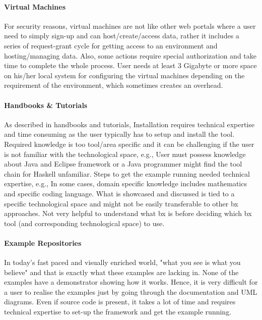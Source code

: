 \paragraph{Virtual Machines}
For security reasons, virtual machines are not like other web portals where a user need to simply sign-up and can host/create/access data, rather it includes a series of request-grant cycle for getting access to an environment and hosting/managing data. Also, some actions require special authorization and take time to complete the whole process.
\newline\newline User needs at least 3 Gigabyte or more space on his/her local system for configuring the virtual machines depending on the requirement of the environment, which sometimes creates an overhead.

\paragraph{Handbooks \& Tutorials}
As described in handbooks and tutorials, Installation requires technical expertise and time consuming as the user typically has to setup and install the tool.
\newline\newline Required knowledge is too tool/area specific and it can be challenging if the user is not familiar with the technological space, e.g., User must possess knowledge about Java and Eclipse framework or a Java programmer might find the tool chain for Haskell unfamiliar.
\newline\newline Steps to get the example running needed technical expertise, e.g., In some cases, domain specific knowledge includes mathematics and specific coding language. What is showcased and discussed is tied to a specific technological space and might not be easily transferable to other bx approaches.
\newline\newline Not very helpful to understand what bx is before deciding which bx tool (and corresponding technological space) to use.

\paragraph{Example Repositories}
In today's fast paced and visually enriched world, "what you see is what you believe" and that
is exactly what these examples are lacking in. None of the examples have a demonstrator
showing how it works. Hence, it is very difficult for a user to realise the examples just by going
through the documentation and UML diagrams. Even if source code is present, it takes a lot
of time and requires technical expertise to set-up the framework and get the example running.